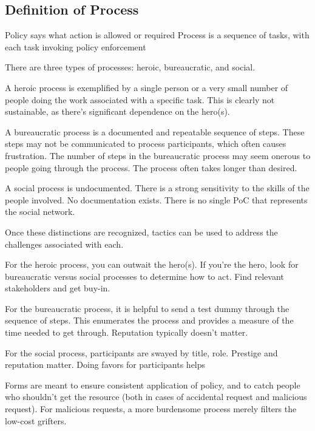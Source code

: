 \subsection{Definition of Process}

Policy says what action is allowed or required
Process is a sequence of tasks, with each task invoking policy enforcement 


There are three types of processes: heroic, bureaucratic, and social.

A heroic process is exemplified by a single person or a very small number of people doing the work associated with a specific task. This is clearly not sustainable, as there's significant dependence on the hero(s).

A bureaucratic process is a documented and repeatable sequence of steps. These steps may not be communicated to process participants, which often causes frustration. The number of steps in the bureaucratic process may seem onerous to people going through the process. The process often takes longer than desired.

A social process is undocumented. There is a strong sensitivity to the skills of the people involved. No documentation exists. There is no single PoC that represents the social network.

Once these distinctions are recognized, tactics can be used to address the challenges associated with each.

For the heroic process, you can outwait the hero(s). If you're the hero, look for bureaucratic versus social processes to determine how to act. Find relevant stakeholders and get buy-in.

For the bureaucratic process, it is helpful to send a test dummy through the sequence of steps. This enumerates the process and provides a measure of the time needed to get through. Reputation typically doesn't matter.

For the social process, participants are swayed by title, role. Prestige and reputation matter. Doing favors for participants helps



Forms are meant to ensure consistent application of policy, and to catch people who shouldn't get the resource (both in cases of accidental request and malicious request). For malicious requests, a more burdensome process merely filters the low-cost grifters. 



